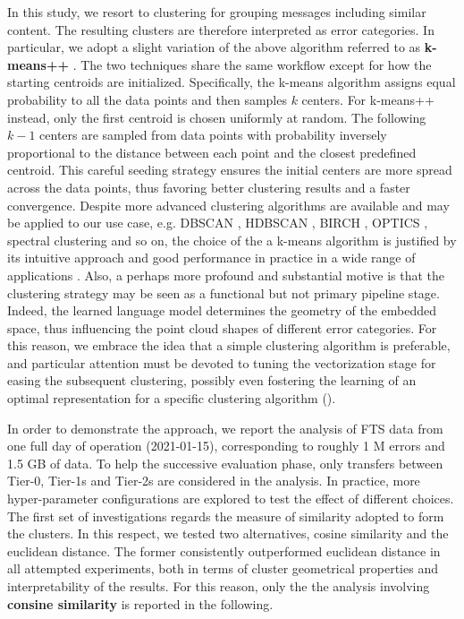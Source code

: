 In this study, we resort to clustering for grouping messages including similar content.
The resulting clusters are therefore interpreted as error categories.
In particular, we adopt a slight variation of the above algorithm referred to as \mbox{\textbf{k-means++}} \cite{arthur2006kmeans++}.
The two techniques share the same workflow except for how the starting centroids are initialized.  
Specifically, the \mbox{k-means} algorithm assigns equal probability to all the data points and then samples $k$ centers.
For \mbox{k-means++} instead, only the first centroid is chosen uniformly at random. The following $k-1$ centers are sampled from data points with probability inversely proportional to the distance between each point and the closest predefined centroid.
This careful seeding strategy ensures the initial centers are more spread across the data points, thus favoring better clustering results and a faster convergence.
Despite more advanced clustering algorithms are available and may be applied to our use case, e.g. DBSCAN \cite{ester1996dbscan}, HDBSCAN \cite{mcinnes2017hdbscan}, BIRCH \cite{zhang1996birch}, OPTICS \cite{ankerst1999optics}, spectral clustering \cite{ng2002spectral} and so on, the choice of the a \mbox{k-means} algorithm is justified by its intuitive approach and good performance in practice in a wide range of applications \cite{von2012clustering}.
Also, a perhaps more profound and substantial motive is that the clustering strategy may be seen as a functional but not primary pipeline stage. Indeed, the learned language model determines the geometry of the embedded space, thus influencing the point cloud shapes of different error categories. 
For this reason, we embrace the idea that a simple clustering algorithm is preferable, and particular attention must be devoted to tuning the vectorization stage for easing the subsequent clustering, possibly even fostering the learning of an optimal representation for a specific clustering algorithm (\cite{yang2017kmeans-friendly}).

In order to demonstrate the approach, we report the analysis of FTS data from one full day of operation (2021-01-15), corresponding to roughly 1 M errors and 1.5 GB of data.
To help the successive evaluation phase, only transfers between Tier-0, Tier-1s and Tier-2s are considered in the analysis.
In practice, more hyper-parameter configurations are explored to test the effect of different choices.
The first set of investigations regards the measure of similarity adopted to form the clusters. 
In this respect, we tested two alternatives, cosine similarity and the euclidean distance.
The former consistently outperformed euclidean distance in all attempted experiments, 
both in terms of cluster geometrical properties and interpretability of the results.
For this reason, only the the analysis involving \textbf{consine similarity} is reported in the following.

